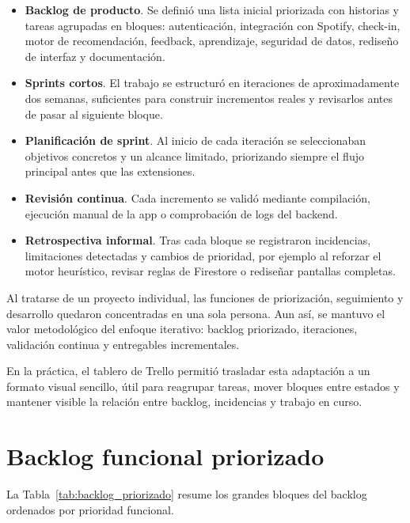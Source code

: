 \begin{itemize}
    \item \textbf{Backlog de producto}. Se definió una lista inicial priorizada con historias y tareas agrupadas en bloques: autenticación, integración con Spotify, check-in, motor de recomendación, feedback, aprendizaje, seguridad de datos, rediseño de interfaz y documentación.
    \item \textbf{Sprints cortos}. El trabajo se estructuró en iteraciones de aproximadamente dos semanas, suficientes para construir incrementos reales y revisarlos antes de pasar al siguiente bloque.
    \item \textbf{Planificación de sprint}. Al inicio de cada iteración se seleccionaban objetivos concretos y un alcance limitado, priorizando siempre el flujo principal antes que las extensiones.
    \item \textbf{Revisión continua}. Cada incremento se validó mediante compilación, ejecución manual de la app o comprobación de logs del backend.
    \item \textbf{Retrospectiva informal}. Tras cada bloque se registraron incidencias, limitaciones detectadas y cambios de prioridad, por ejemplo al reforzar el motor heurístico, revisar reglas de Firestore o rediseñar pantallas completas.
\end{itemize}

Al tratarse de un proyecto individual, las funciones de priorización,
seguimiento y desarrollo quedaron concentradas en una sola persona. Aun así, se
mantuvo el valor metodológico del enfoque iterativo: backlog priorizado,
iteraciones, validación continua y entregables incrementales.

En la práctica, el tablero de Trello permitió trasladar esta adaptación a un
formato visual sencillo, útil para reagrupar tareas, mover bloques entre
estados y mantener visible la relación entre backlog, incidencias y trabajo en
curso.

\section{Backlog funcional priorizado}
\label{sec:backlog_funcional_priorizado}

La Tabla~\ref{tab:backlog_priorizado} resume los grandes bloques del backlog
ordenados por prioridad funcional.

